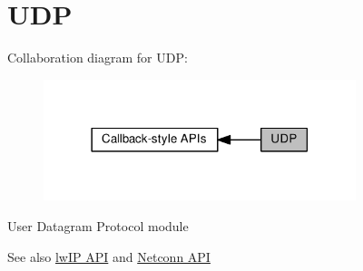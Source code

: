 \hypertarget{group__udp__raw}{}\section{U\+DP}
\label{group__udp__raw}
Collaboration diagram for U\+DP\+:
\nopagebreak
\begin{figure}[H]
\begin{center}
\leavevmode
\includegraphics[width=258pt]{group__udp__raw}
\end{center}
\end{figure}
User Datagram Protocol module~\newline
\begin{DoxySeeAlso}{See also}
\hyperlink{raw_api}{lw\+IP A\+PI} and \hyperlink{group__netconn}{Netconn A\+PI} 
\end{DoxySeeAlso}
